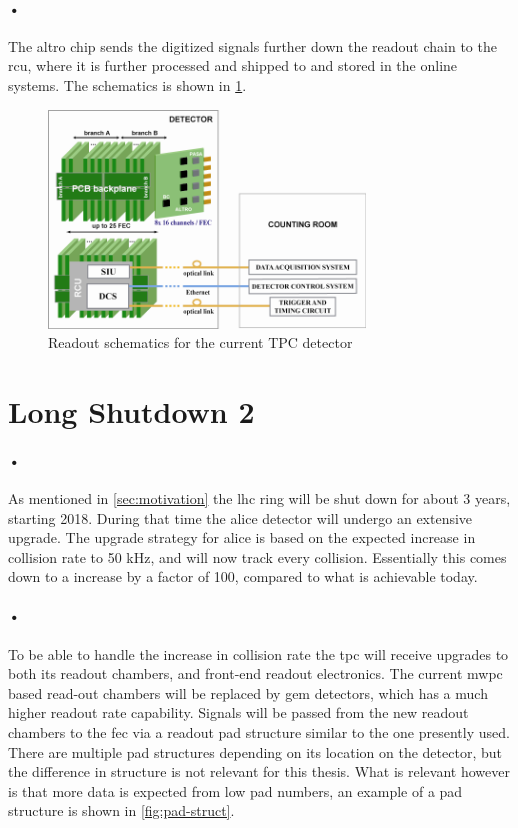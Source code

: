 \documentclass[a4paper, 12pt]{report}
\begin{document}
\paragraph{•}
The \gls{altro} chip sends the digitized signals further down the readout chain to the \gls{rcu}, where it is further processed and shipped to  and stored in the online systems.
The schematics is shown in \ref{fig:altro}.

\begin{figure}[h!]
  \centering
    \includegraphics[width=0.75\textwidth]{images/altro.png}
     \caption{Readout schematics for the current TPC detector}
    \label{fig:altro}
\end{figure}

\section{Long Shutdown 2}
\paragraph{•}
As mentioned in \ref{sec:motivation} the \gls{lhc} ring will be shut down for about 3 years, starting 2018.
During that time the \gls{alice} detector will undergo an extensive upgrade.
The upgrade strategy for \gls{alice} is based on the expected increase in collision rate to 50 kHz, and will now track every collision.
Essentially this comes down to a increase by a factor of 100, compared to what is achievable today.

\paragraph{•} %
To be able to handle the increase in collision rate the \gls{tpc} will receive upgrades to both its readout chambers, and front-end readout electronics.
The current \gls{mwpc} based read-out chambers will be replaced by \gls{gem} detectors, which has a much higher readout rate capability.
Signals will be passed from the new readout chambers to the \gls{fec} via a readout pad structure similar to the one presently used.
There are multiple pad structures depending on its location on the detector, but the difference in structure is not relevant for this thesis.
What is relevant however is that more data is expected from low pad numbers, an example of a pad structure is shown in \ref{fig:pad-struct}.
\end{document}
